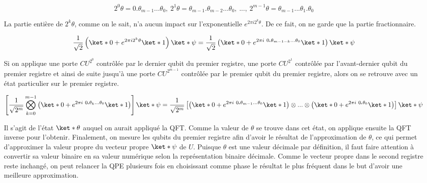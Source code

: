 \begin{equation*}
    2^0 \theta = 0\pmb{.}\theta_{m-1}...\theta_0, \ 2^1 \theta = \theta_{m-1}\pmb{.}\theta_{m-2}...\theta_0, \ ..., \ 2^{m-1}\theta = \theta_{m-1}...\theta_1\pmb{.}\theta_0
\end{equation*}

La partie entière de $2^k\theta$, comme on le sait, n'a aucun impact sur l'exponentielle $e^{2\pi i 2^k\theta}$. De ce fait, on ne garde que la partie fractionnaire. 

\begin{equation*}
    \frac{1}{\sqrt{2}}\left(\ket*{0} + e^{2\pi i 2^k \theta}\ket*{1}\right) \ket*{\psi} = \frac{1}{\sqrt{2}}\left(\ket*{0} + e^{2\pi i \ 0\pmb{.}\theta_{m-1-k}...\theta_0}\ket*{1}\right) \ket*{\psi}  
\end{equation*} 

Si on applique une porte $CU^{2^0}$ contrôlée par le dernier qubit du premier registre, une porte $CU^{2^1}$ contrôlée par l'avant-dernier qubit du premier registre et ainsi de suite jusqu'à une porte $CU^{2^{m-1}}$ contrôlée par le premier qubit du premier registre, alors on se retrouve avec un état particulier sur le premier registre.

\begin{equation*}
    \left[\frac{1}{\sqrt{2^m}} \bigotimes_{k=0}^{m-1} \left(\ket*{0} + e^{2\pi i \ 0\pmb{.}\theta_{k}...\theta_0}\ket*{1}\right)\right]\ket*{\psi} = \frac{1}{\sqrt{2^m}} \left[\left(\ket*{0} + e^{2\pi i \ 0\pmb{.}\theta_{m-1}...\theta_0} \ket*{1}\right) \otimes ... \otimes \left(\ket*{0} + e^{2\pi i \ 0\pmb{.}\theta_0 } \ket*{1}\right) \right] \ket*{\psi}
\end{equation*}

Il s'agit de l'état $\ket*{\theta}$ auquel on aurait appliqué la QFT. Comme la valeur de $\theta$ se trouve dans cet état, on applique ensuite la QFT inverse pour l'obtenir. Finalement, on mesure les qubits du premier registre afin d'avoir le résultat de l'approximation de $\theta$, ce qui permet d'approximer la valeur propre du vecteur propre $\ket*{\psi}$ de $U$. Puisque $\theta$ est une valeur décimale par définition, il faut faire attention à convertir sa valeur binaire en sa valeur numérique selon la représentation binaire décimale. Comme le vecteur propre dans le second registre reste inchangé, on peut relancer la QPE plusieurs fois en choisissant comme phase le résultat le plus fréquent dans le but d'avoir une meilleure approximation.

